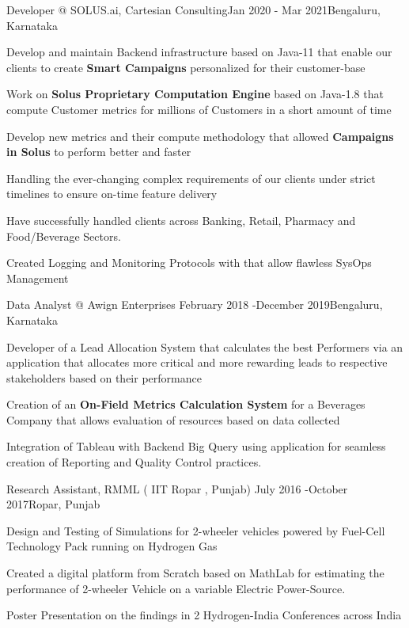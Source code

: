\documentclass[
	a4paper, %
	12pt, %
]{resume} %
\begin{document}
	\begin{rSubsection}{ Developer @ SOLUS.ai, Cartesian Consulting}{Jan 2020 - Mar 2021}{}{Bengaluru, Karnataka}
		\setlength{\itemsep}{0.01em}
		\item Develop and maintain Backend infrastructure based on Java-11 that enable our clients to create \textbf{ Smart Campaigns} personalized for their customer-base
		\item Work on \textbf{ Solus Proprietary Computation Engine} based on Java-1.8 that compute Customer metrics for millions of Customers in a short amount of time
		\item Develop new metrics and their compute methodology that allowed \textbf{ Campaigns in Solus} to perform better and faster
		\item Handling the ever-changing complex requirements of our clients under strict timelines to ensure on-time feature delivery
		\item Have successfully handled clients across Banking, Retail, Pharmacy and Food/Beverage Sectors.
		\item Created Logging and Monitoring Protocols with that allow flawless SysOps Management

	\end{rSubsection}
\newpage
	\begin{rSubsection}{Data Analyst @ Awign Enterprises }{February 2018 -December 2019}{}{Bengaluru, Karnataka}
		\setlength{\itemsep}{0.01em}
		\item Developer of a Lead Allocation System that calculates the best Performers via an application that allocates more critical and more rewarding leads to respective stakeholders based on their performance 
		\item Creation of an \textbf{ On-Field Metrics Calculation System} for a Beverages Company that allows evaluation of resources based on data collected 
		\item Integration of Tableau with Backend Big Query using   application for seamless creation of Reporting and Quality Control practices.
	\end{rSubsection}

	\begin{rSubsection}{Research Assistant, RMML ( IIT Ropar , Punjab) }{July 2016 -October 2017}{}{Ropar, Punjab}
		\setlength{\itemsep}{0.01em}
		\item Design and Testing of Simulations for 2-wheeler vehicles powered by Fuel-Cell Technology Pack running on Hydrogen Gas
		\item Created a digital platform from Scratch based on MathLab for estimating the performance of 2-wheeler Vehicle on a variable Electric Power-Source.
		\item Poster Presentation on the findings in 2 Hydrogen-India Conferences across India
	\end{rSubsection}
\end{document}
